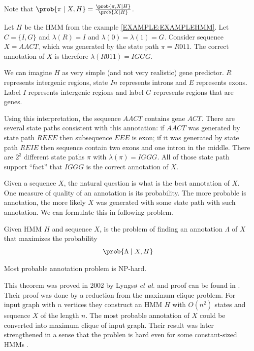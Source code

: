 Note that $\prob{\pi\mid X,H}=\frac{\prob{\pi,X\mid H}}{\prob{X\mid
H}}$.

\begin{example}\label{EXAMPLE:ANNOTATION}
Let $H$ be the HMM from the example \ref{EXAMPLE:EXAMPLEHMM}. Let $C=\{I,G\}$ and
$\lambda(R)=I$ and $\lambda(0)=\lambda(1)=G$.  Consider sequence
$X=AACT$, which was generated by the state path $\pi=R011$. The correct
annotation of $X$ is therefore  $\lambda(R011) =
IGGG$. 

 We can imagine $H$ as very simple (and not very realistic) gene
predictor. $R$ represents intergenic regions, state $In$
represents introns and $E$ represents exons. Label $I$ represents
intergenic regions and label $G$ represents regions that are genes.

Using this interpretation, the sequence $AACT$ contains gene $ACT$. There are
several state paths consistent with this annotation: if $AACT$ was generated by state path
$REEE$ then subsequence $EEE$ is exon; if it was generated by state path $REIE$
then sequence contain two exons and one intron in the middle. There are $2^3$
different state paths $\pi$ with $\lambda(\pi)=IGGG$.  All of those state path
support ``fact'' that $IGGG$ is the correct annotation of $X$.

\end{example}



Given a sequence $X$, the natural question is what is the best annotation of
$X$.  One measure of quality of an annotation is its probability. The more
probable is annotation, the more likely $X$ was generated with some state path with
such annotation. We can formulate this in following problem.

\begin{definition}
Given HMM $H$ and sequence $X$,  is the problem of finding an annotation $\Lambda$ of $X$ that maximizes
the probability \[\prob{\Lambda\mid X,H}\]
\end{definition}

\begin{theorem}
Most probable annotation problem is NP-hard.
\end{theorem}
This theorem was proved in 2002 by Lyngsø {\it et al.} and proof can be found in
\cite{Lyngso2002}. Their proof was done by a reduction from the maximum clique problem.
For input graph with $n$ vertices they construct an HMM $H$ with $O(n^2)$ states and
sequence $X$ of the length $n$. The most probable annotation of $X$ could be
converted into maximum clique of input graph. 
Their result was later strengthened in a sense that the problen is hard even for some constant-sized HMMs \cite{Brejova2007mpa}.

